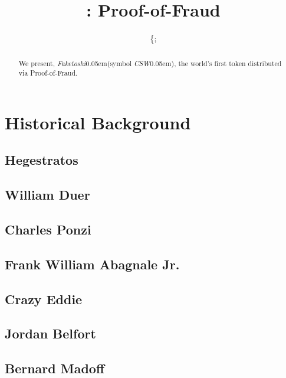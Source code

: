 \documentclass[]{article}
\title{\faketoshi: Proof-of-Fraud}
\author{\{;}
\newcommand{\term}[1]{\textsl{#1}\kern 0.05em\xspace}
\newcommand{\faketoshi}{\term{Faketoshi}}
\newcommand{\csw}{\term{CSW}}
\begin{document}
\maketitle

\begin{abstract}
We present, \faketoshi (symbol \csw{}), the world's first token distributed via Proof-of-Fraud.
\end{abstract}

\section{Historical Background}
\subsection{Hegestratos}

\subsection{William Duer}

\subsection{Charles Ponzi}

\subsection{Frank William Abagnale Jr.}

\subsection{Crazy Eddie}

\subsection{Jordan Belfort}

\subsection{Bernard Madoff}
\end{document}
